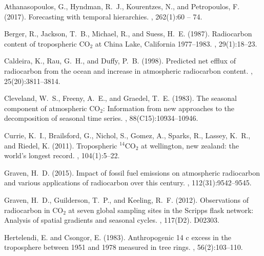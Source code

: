 \documentclass[a4paper, 11pt]{article}
\begin{document}
%
%
\begin{thebibliography}{}

Athanasopoulos, G., Hyndman, R.~J., Kourentzes, N., and Petropoulos, F. (2017).
\newblock Forecasting with temporal hierarchies.
, 262(1):60 -- 74.

Berger, R., Jackson, T.~B., Michael, R., and Suess, H.~E. (1987).
\newblock Radiocarbon content of tropospheric {CO$_2$ at China Lake,
  California} 1977--1983.
, 29(1):18--23.

Caldeira, K., Rau, G.~H., and Duffy, P.~B. (1998).
\newblock Predicted net efflux of radiocarbon from the ocean and increase in
  atmospheric radiocarbon content.
, 25(20):3811--3814.

Cleveland, W.~S., Freeny, A.~E., and Graedel, T.~E. (1983).
\newblock The seasonal component of atmospheric {CO$_2$}: Information from new
  approaches to the decomposition of seasonal time series.
, 88(C15):10934--10946.

Currie, K.~I., Brailsford, G., Nichol, S., Gomez, A., Sparks, R., Lassey,
  K.~R., and Riedel, K. (2011).
\newblock Tropospheric {$^{14}$CO$_2$} at wellington, new zealand: the world's
  longest record.
, 104(1):5--22.

Graven, H.~D. (2015).
\newblock Impact of fossil fuel emissions on atmospheric radiocarbon and
  various applications of radiocarbon over this century.
,
  112(31):9542--9545.

Graven, H.~D., Guilderson, T.~P., and Keeling, R.~F. (2012).
\newblock Observations of radiocarbon in {CO$_2$} at seven global sampling
  sites in the {Scripps} flask network: Analysis of spatial gradients and
  seasonal cycles.
, 117(D2).
\newblock D02303.

Hertelendi, E. and Csongor, E. (1983).
\newblock Anthropogenic 14 c excess in the troposphere between 1951 and 1978
  measured in tree rings.
, 56(2):103--110.


\end{thebibliography}
\end{document}
